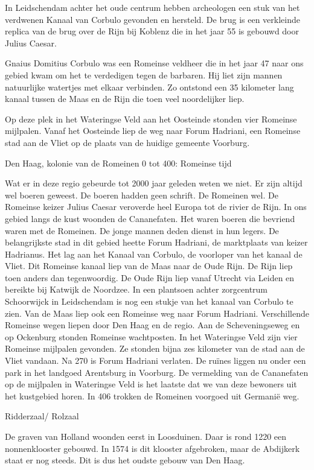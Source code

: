 \documentclass[
  a4paper,
]{book}
\begin{document}
In Leidschendam achter het oude centrum hebben archeologen een stuk van het verdwenen Kanaal van Corbulo gevonden en hersteld. De brug is een verkleinde replica van de brug over de Rijn bij Koblenz die in het jaar 55 is gebouwd door Julius Caesar.

Gnaius Domitius Corbulo was een Romeinse veldheer die in het jaar 47 naar ons gebied kwam om het te verdedigen tegen de barbaren. Hij liet zijn mannen natuurlijke watertjes met elkaar verbinden. Zo ontstond een 35 kilometer lang kanaal tussen de Maas en de Rijn die toen veel noordelijker liep.

Op deze plek in het Wateringse Veld aan het Oosteinde stonden vier Romeinse mijlpalen. Vanaf het Oosteinde liep de weg naar Forum Hadriani, een Romeinse stad aan de Vliet op de plaats van de huidige gemeente Voorburg.

Den Haag, kolonie van de Romeinen
0 tot 400: Romeinse tijd

Wat er in deze regio gebeurde tot 2000 jaar geleden weten we niet.
Er zijn altijd wel boeren geweest. De boeren hadden geen schrift. De Romeinen wel.
De Romeinse keizer Julius Caesar veroverde heel Europa tot de rivier de Rijn.
In ons gebied langs de kust woonden de Cananefaten.
Het waren boeren die bevriend waren met de Romeinen.
De jonge mannen deden dienst in hun legers.
De belangrijkste stad in dit gebied heette Forum Hadriani, de marktplaats van keizer Hadrianus.
Het lag aan het Kanaal van Corbulo, de voorloper van het kanaal de Vliet.
Dit Romeinse kanaal liep van de Maas naar de Oude Rijn.
De Rijn liep toen anders dan tegenwoordig.
De Oude Rijn liep vanaf Utrecht via Leiden en bereikte bij Katwijk de Noordzee.
In een plantsoen achter zorgcentrum Schoorwijck in Leidschendam is nog een stukje van het kanaal van Corbulo te zien.
Van de Maas liep ook een Romeinse weg naar Forum Hadriani.
Verschillende Romeinse wegen liepen door Den Haag en de regio.
Aan de Scheveningseweg en op Ockenburg stonden Romeinse wachtposten.
In het Wateringse Veld zijn vier Romeinse mijlpalen gevonden.
Ze stonden bijna zes kilometer van de stad aan de Vliet vandaan.
Na 270 is Forum Hadriani verlaten.
De ruïnes liggen nu onder een park in het landgoed Arentsburg in Voorburg.
De vermelding van de Cananefaten op de mijlpalen in Wateringse Veld is het laatste dat we van deze bewoners uit het kustgebied horen.
In 406 trokken de Romeinen voorgoed uit Germanië weg.

Ridderzaal/ Rolzaal

De graven van Holland woonden eerst in Loosduinen. Daar is rond 1220 een nonnenklooster gebouwd. In 1574 is dit klooster afgebroken, maar de Abdijkerk staat er nog steeds. Dit is dus het oudste gebouw van Den Haag.
\end{document}
